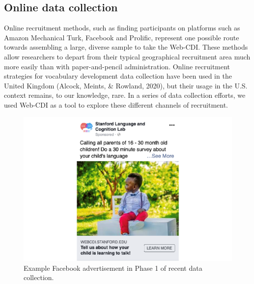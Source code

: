 \documentclass[
  english,
  ,man,floatsintext]{apa6}
\begin{document}
\hypertarget{online-data-collection}{%
\subsection{Online data collection}\label{online-data-collection}}

Online recruitment methods, such as finding participants on platforms such as Amazon Mechanical Turk, Facebook and Prolific, represent one possible route towards assembling a large, diverse sample to take the Web-CDI. These methods allow researchers to depart from their typical geographical recruitment area much more easily than with paper-and-pencil administration. Online recruitment strategies for vocabulary development data collection have been used in the United Kingdom (Alcock, Meints, \& Rowland, 2020), but their usage in the U.S. context remains, to our knowledge, rare. In a series of data collection efforts, we used Web-CDI as a tool to explore these different channels of recruitment.

\begin{figure}
\centering
\includegraphics{webcdi_paper_files/figure-latex/facebookad-1.pdf}
\caption{\label{fig:facebookad}Example Facebook advertisement in Phase 1 of recent data collection.}
\end{figure}
\end{document}
